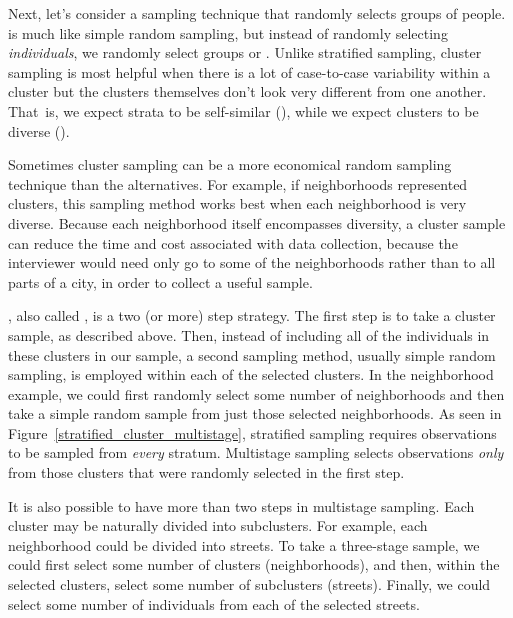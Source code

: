 Next, let's consider a sampling technique that randomly selects groups of people.  is much like simple random sampling, but instead of randomly selecting \emph{individuals}, we randomly select groups or . Unlike stratified sampling, cluster sampling is most helpful when there is a lot of case-to-case variability within a cluster but the clusters themselves don't look very different from one another. That~is, we expect strata to be self-similar (), while we expect clusters to be diverse ().

Sometimes cluster sampling can be a more economical random sampling technique than the alternatives. For example, if neighborhoods represented clusters, this sampling method works best when each neighborhood is very diverse. Because each neighborhood itself encompasses diversity, a cluster sample can reduce the time and cost associated with data collection, because the interviewer would need only go to some of the neighborhoods rather than to all parts of a city, in order to collect a useful sample.

, also called , is a two (or more) step strategy. The first step is to take a cluster sample, as described above. Then, instead of including all of the individuals in these clusters in our sample, a second sampling method, usually simple random sampling, is employed within each of the selected clusters. In the neighborhood example, we could first randomly select some number of neighborhoods and then take a simple random sample from just those selected neighborhoods. As seen in Figure~\ref{stratified_cluster_multistage}, stratified sampling requires observations to be sampled from \emph{every} stratum. Multistage sampling selects observations \emph{only} from those clusters that were randomly selected in the first step.

It is also possible to have more than two steps in multistage sampling. Each cluster may be naturally divided into subclusters. For example, each neighborhood could be divided into streets. To take a three-stage sample, we could first select some number of clusters (neighborhoods), and then, within the selected clusters, select some number of subclusters (streets). Finally, we could select some number of individuals from each of the selected streets.

